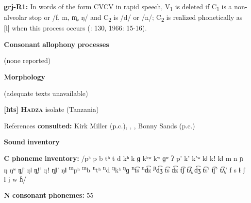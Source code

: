 \documentclass[output=paper]{langsci/langscibook}
\begin{document}
\begin{styleBody}
\textbf{grj-R1:} In words of the form CVCV in rapid speech, V\textsubscript{1} is deleted if C\textsubscript{1} is a non-alveolar stop or /f, m, m̥, ŋ/ and C\textsubscript{2} is /d/ or /n/; C\textsubscript{2} is realized phonetically as [l] when this process occurs (\citealt{Innes1981}: 130, 1966: 15-16).
\end{styleBody}

\begin{styleBody}
\textbf{Consonant} \textbf{allophony} \textbf{processes}
\end{styleBody}

\begin{styleBody}
(none reported)
\end{styleBody}

\begin{styleBody}
\textbf{Morphology}
\end{styleBody}

\begin{styleBody}
(adequate texts unavailable)
\end{styleBody}

\begin{styleBody}
\textbf{[hts]}   \textbf{\textsc{Hadza}}  isolate (Tanzania)
\end{styleBody}

\begin{styleBody}
References \textbf{consulted:} Kirk Miller (p.c.), \citet{Sands2013}, \citet{SandsEtAl2012}, Bonny Sands (p.c.)
\end{styleBody}

\begin{styleBody}
\textbf{Sound} \textbf{inventory}
\end{styleBody}

\begin{styleBody}
\textbf{C} \textbf{phoneme} \textbf{inventory:} /pʰ p b tʰ t d kʰ k ɡ kʰʷ kʷ ɡʷ ʔ p’ k’ k’ʷ kǀ kǃ kǁ m n ɲ ŋ ŋʷ ŋ̥ǀ’ ŋǀ ŋ̥ǃ’ ŋǃ ŋ̥ǁ’ ŋǁ \textsuperscript{m}pʰ \textsuperscript{m}b \textsuperscript{n}tʰ \textsuperscript{n}d \textsuperscript{ŋ}kʰ \textsuperscript{ŋ}ɡ \textsuperscript{n}t͡s \textsuperscript{n}d͡z \textsuperscript{ɲ}d͡ʒ t͡s d͡z t͡ʃ t͡ʎ̥ d͡ʒ t͡s’ t͡ʃ’ t͡ʎ̥’ f s ɬ ʃ l j w ɦ/
\end{styleBody}

\begin{styleBody}
\textbf{N} \textbf{consonant} \textbf{phonemes:} 55
\end{styleBody}
\end{document}
